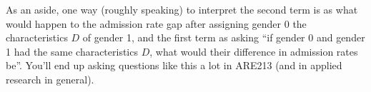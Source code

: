 \documentclass[12pt,english]{article}
\begin{document}
As an aside, one way (roughly speaking) to interpret the second term is as what would happen to the admission rate gap after assigning gender 0 the characteristics $D$ of gender 1, and the first term as asking ``if gender 0 and gender 1 had the same characteristics $D$, what would their difference in admission rates be''. You'll end up asking questions like this a lot in ARE213 (and in applied research in general).
\end{document}
